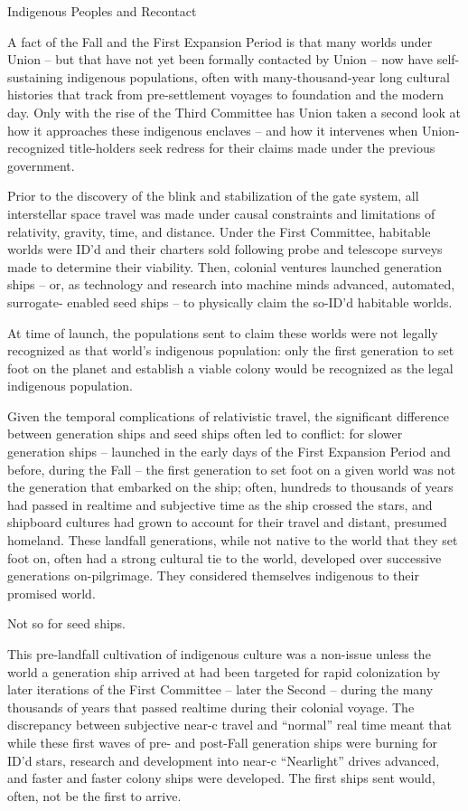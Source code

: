 Indigenous Peoples and Recontact

A fact of the Fall and the First Expansion Period is that many worlds under Union -- but that have
not yet been formally contacted by Union -- now have self-sustaining indigenous populations,
often with many-thousand-year long cultural histories that track from pre-settlement voyages to
foundation and the modern day. Only with the rise of the Third Committee has Union taken a
second look at how it approaches these indigenous enclaves -- and how it intervenes when
Union-recognized title-holders seek redress for their claims made under the previous
government.


Prior to the discovery of the blink and stabilization of the gate system, all interstellar space travel
was made under causal constraints and limitations of relativity, gravity, time, and distance. Under
the First Committee, habitable worlds were ID’d and their charters sold following probe and
telescope surveys made to determine their viability. Then, colonial ventures launched generation
ships -- or, as technology and research into machine minds advanced,  automated, surrogate-
enabled seed ships -- to physically claim the so-ID’d habitable worlds.


At time of launch, the populations sent to claim these worlds were not legally recognized as that
world’s indigenous population: only the first generation to set foot on the planet and establish a
viable colony would be recognized as the legal indigenous population.


Given the temporal complications of relativistic travel, the significant difference between
generation ships and seed ships often led to conflict: for slower generation ships -- launched in
the early days of the First Expansion Period and before, during the Fall -- the first generation to
set foot on a given world was not the generation that embarked on the ship; often, hundreds to
thousands of years had passed in realtime and subjective time as the ship crossed the stars, and
shipboard cultures had grown to account for their travel and distant, presumed homeland. These
landfall generations, while not native to the world that they set foot on, often had a strong
cultural tie to the world, developed over successive generations on-pilgrimage. They considered
themselves indigenous to their promised world.


Not so for seed ships.


This pre-landfall cultivation of indigenous culture was a non-issue unless the world a generation
ship arrived at had been targeted for rapid colonization by later iterations of the First Committee
-- later the Second -- during the many thousands of years that passed realtime during their
colonial voyage. The discrepancy between subjective near-c travel and “normal” real time meant
that while these first waves of pre- and post-Fall generation ships were burning for ID’d stars,
research and development into near-c “Nearlight” drives advanced, and faster and faster colony
ships were developed. The first ships sent would, often, not be the first to arrive.



